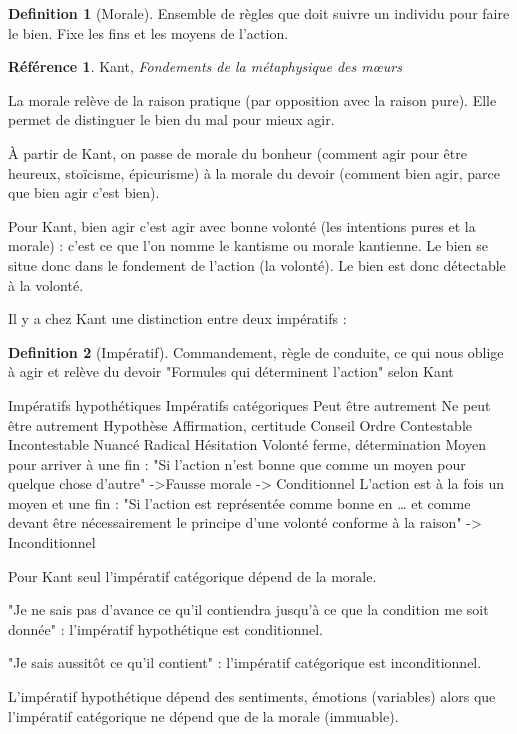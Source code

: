 \documentclass[french]{book}
\theoremstyle{definition}
\newtheorem*{dfn}{Definition}
\newtheorem*{refe}{Référence}
\begin{document}
\begin{dfn}[Morale]
Ensemble de règles que doit suivre un individu pour faire le bien. Fixe les fins et les moyens de l’action.
\end{dfn}

\begin{refe}
	Kant, \textit{Fondements de la métaphysique des mœurs} 
\end{refe}

La morale relève de la raison pratique (par opposition avec la raison pure). Elle permet de distinguer le bien du mal pour mieux agir.

À partir de Kant, on passe de morale du bonheur (comment agir pour être heureux, stoïcisme, épicurisme) à la morale du devoir (comment bien agir, parce que bien agir c'est bien).

Pour Kant, bien agir c'est agir avec bonne volonté (les intentions pures et la morale) : c'est ce que l'on nomme le kantisme ou morale kantienne.
Le bien se situe donc dans le fondement de l'action (la volonté). Le bien est donc détectable à la volonté.

Il y a chez Kant une distinction entre deux impératifs :
\begin{dfn}[Impératif]
Commandement, règle de conduite, ce qui nous oblige à agir et relève du devoir
"Formules qui déterminent l'action" selon Kant
\end{dfn}

Impératifs hypothétiques 
Impératifs catégoriques
Peut être autrement
Ne peut être autrement
Hypothèse 
Affirmation, certitude 
Conseil
Ordre
Contestable
Incontestable
Nuancé
Radical
Hésitation
Volonté ferme, détermination 
Moyen pour arriver à une fin :
"Si l'action n'est bonne que comme un moyen pour quelque chose d'autre"
->Fausse morale
-> Conditionnel
L'action est à la fois un moyen et une fin :
"Si l'action est représentée comme bonne en … et comme devant être nécessairement le principe d'une volonté conforme à la raison"
-> Inconditionnel

Pour Kant seul l'impératif catégorique dépend de la morale.

"Je ne sais pas d'avance ce qu'il contiendra jusqu'à ce que la condition me soit donnée" : l'impératif hypothétique est conditionnel.

"Je sais aussitôt ce qu'il contient" : l'impératif catégorique est inconditionnel.

L'impératif hypothétique dépend des sentiments, émotions (variables) alors que l'impératif catégorique ne dépend que de la morale (immuable).
\end{document}
